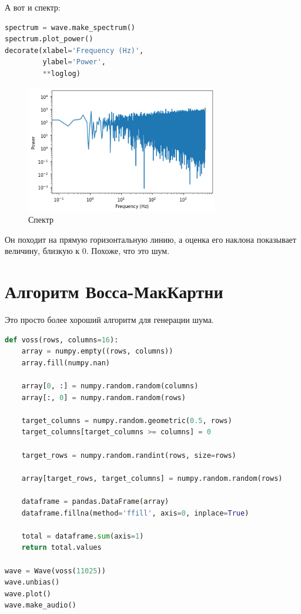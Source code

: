 \documentclass[a4paper,12pt]{report}
\begin{document}
    А вот и спектр:
    
\begin{lstlisting}[language=Python,caption=Спектр]
spectrum = wave.make_spectrum()
spectrum.plot_power()
decorate(xlabel='Frequency (Hz)',
         ylabel='Power',
         **loglog)
\end{lstlisting}

    \begin{figure}[H]
        \centering
        \includegraphics[width=0.75\textwidth]{ex4_spectrum}
        \caption{Спектр}
        \label{fig:ex4_spectrum}
    \end{figure}
    
    Он походит на прямую горизонтальную линию, а оценка его наклона показывает величину, близкую к 0. Похоже, что это  шум.
    
    \chapter{Алгоритм Восса-МакКартни}
    
    Это просто более хороший алгоритм для генерации  шума.
    
\begin{lstlisting}[language=Python,caption=Алгоритм]
def voss(rows, columns=16):
    array = numpy.empty((rows, columns))
    array.fill(numpy.nan)
    
    array[0, :] = numpy.random.random(columns)
    array[:, 0] = numpy.random.random(rows)
    
    target_columns = numpy.random.geometric(0.5, rows)
    target_columns[target_columns >= columns] = 0
    
    target_rows = numpy.random.randint(rows, size=rows)
    
    array[target_rows, target_columns] = numpy.random.random(rows)

    dataframe = pandas.DataFrame(array)
    dataframe.fillna(method='ffill', axis=0, inplace=True)
    
    total = dataframe.sum(axis=1)
    return total.values

wave = Wave(voss(11025))
wave.unbias()
wave.plot()
wave.make_audio()
\end{lstlisting}
\end{document}
